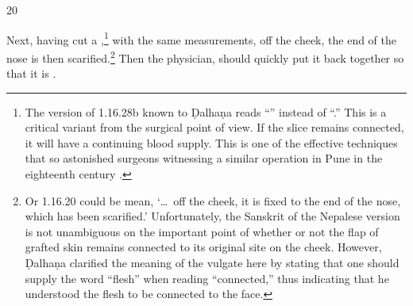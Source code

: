 \begin{translation}
\item[20] 

\begin{em}
    Next, having cut a ,\footnote{The version of
    1.16.28b known to Ḍalhaṇa \citep[81]{vulgate} reads “” instead of “.” This is a critical
    variant from the surgical point of view.  If the slice remains connected,
    it will have a continuing blood supply.  This is one of the effective
    techniques that so astonished surgeons witnessing a similar operation in
    Pune in the eighteenth century \citep[see][67--70]{wuja-2003}.} with the
    same measurements, off the cheek, the end of the nose is then
    scarified.\footnote{Or 1.16.20 could be mean, `\ldots\ off the cheek, it
        is fixed to the end of the nose, which has been scarified.' Unfortunately,
        the Sanskrit of the Nepalese version is not unambiguous on the important
        point of whether or not the flap of grafted skin remains connected to its
        original site on the cheek. However, Ḍalhaṇa \citep[81]{vulgate} clarified
        the meaning of the vulgate here by stating that one should supply the word
        “flesh” when reading “connected,” thus indicating that he understood the
        flesh to be connected to the face.} %
        Then the  physician, should quickly
        put it back together so that it is . \label{well-joined}
\end{em}  



\end{translation}
